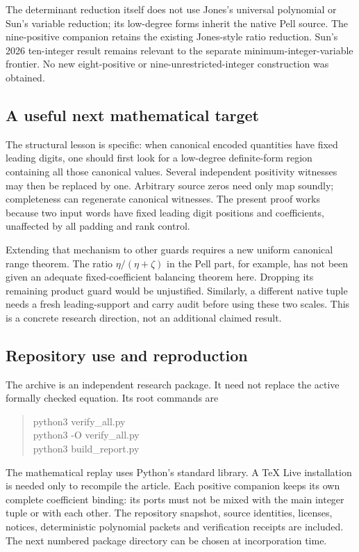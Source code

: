 \documentclass[11pt]{article}
\theoremstyle{definition}\newtheorem{definition}[theorem]{Definition}
\theoremstyle{remark}\newtheorem{remark}[theorem]{Remark}
\begin{document}
The determinant reduction itself does not use Jones's universal polynomial
or Sun's variable reduction; its low-degree forms inherit the native Pell
source. The nine-positive companion retains the existing Jones-style
ratio reduction. Sun's 2026 ten-integer result \cite{sun2026} remains
relevant to the separate minimum-integer-variable frontier. No new
eight-positive or nine-unrestricted-integer construction was obtained.

\subsection{A useful next mathematical target}

The structural lesson is specific: when canonical encoded quantities have
fixed leading digits, one should first look for a low-degree definite-form
region containing all those canonical values. Several independent
positivity witnesses may then be replaced by one. Arbitrary source zeros
need only map soundly; completeness can regenerate canonical witnesses.
The present proof works because two input words have fixed leading digit
positions and coefficients, unaffected by all padding and rank control.

Extending that mechanism to other guards requires a new uniform canonical
range theorem. The ratio $\eta/(\eta+\zeta)$ in the Pell part, for example,
has not been given an adequate fixed-coefficient balancing theorem here.
Dropping its remaining product guard would be unjustified. Similarly, a
different native tuple needs a fresh leading-support and carry audit before
using these two scales. This is a concrete research direction, not an
additional claimed result.

\subsection{Repository use and reproduction}

The archive is an independent research package. It need not replace the
active formally checked equation. Its root commands are
\begin{quote}\ttfamily
python3 verify\_all.py\\
python3 -O verify\_all.py\\
python3 build\_report.py
\end{quote}
The mathematical replay uses Python's standard library. A TeX Live
installation is needed only to recompile the article. Each positive
companion keeps its own complete coefficient binding: its ports must not
be mixed with the main integer tuple or with each other. The repository
snapshot, source identities, licenses, notices, deterministic polynomial
packets and verification receipts are included. The next numbered package
directory can be chosen at incorporation time.
\end{document}

